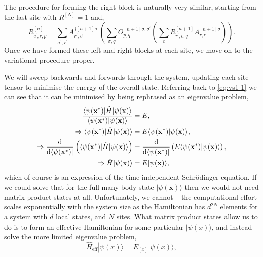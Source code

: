 The procedure for forming the right block is naturally very similar, starting from the last site with \(R^{[N]} = 1\) and,
\begin{equation}
R^{[n]}_{c^{\prime}, r, p} = \sum_{\sigma^{\prime}, r^{\prime}} A^{\dagger [n+1] \sigma^{\prime}}_{r^{\prime}, c^{\prime}} \left( \sum_{\sigma, q} O^{[n+1] \sigma, \sigma^{\prime}}_{p, q} \left( \sum_{c} R^{[n+1]}_{r^{\prime}, c, q} A^{[n+1] \sigma}_{r, c} \right) \right).
\label{eq:vs1-5}
\end{equation}
Once we have formed these left and right blocks at each site, we move on to the variational procedure proper.

We will sweep backwards and forwards through the system, updating each site tensor to minimise the energy of the overall state. Referring back to \cref{eq:vs1-1} we can see that it can be minimised by being rephrased as an eigenvalue problem,
\begin{align}
\frac{\langle \psi(\mathbf{x}^{*}) | \hat{H} | \psi(\mathbf{x}) \rangle}{\langle \psi(\mathbf{x}^{*}) | \psi(\mathbf{x}) \rangle } &= E, \notag \\
\Rightarrow \langle \psi(\mathbf{x}^{*}) | \hat{H} | \psi(\mathbf{x}) \rangle &= E \langle \psi(\mathbf{x}^{*}) | \psi(\mathbf{x}) \rangle, \notag \\
\Rightarrow \frac{\mathrm{d}}{\mathrm{d}\langle \psi(\mathbf{x}^{*}) |} \left( \langle \psi(\mathbf{x}^{*}) | \hat{H} | \psi(\mathbf{x}) \rangle \right) &= \frac{\mathrm{d}}{\mathrm{d}\langle \psi(\mathbf{x}^{*}) |} \left(  E \langle \psi(\mathbf{x}^{*}) | \psi(\mathbf{x}) \rangle \right), \notag \\
\Rightarrow \hat{H} |\psi(\mathbf{x}) \rangle &= E | \psi(\mathbf{x}) \rangle,
\label{eq:vs1-6}
\end{align}
which of course is an expression of the time-independent Schr\"{o}dinger equation. If we could solve that for the full many-body state \(| \psi (\mathbf{x}) \rangle\) then we would not need matrix product states at all. Unfortunately, we cannot -- the computational effort scales exponentially with the system size as the Hamiltonian has \(d^{2N}\) elements for a system with \(d\) local states, and \(N\) sites. What matrix product states allow us to do is to form an effective Hamiltonian for some particular \(| \psi(x) \rangle\), and instead solve the more limited eigenvalue problem,
\begin{equation}
\hat{H}_{\mathrm{eff}} |\psi(x) \rangle = E_{[x]} |\psi(x) \rangle,
\label{eq:vs1-7}
\end{equation}
